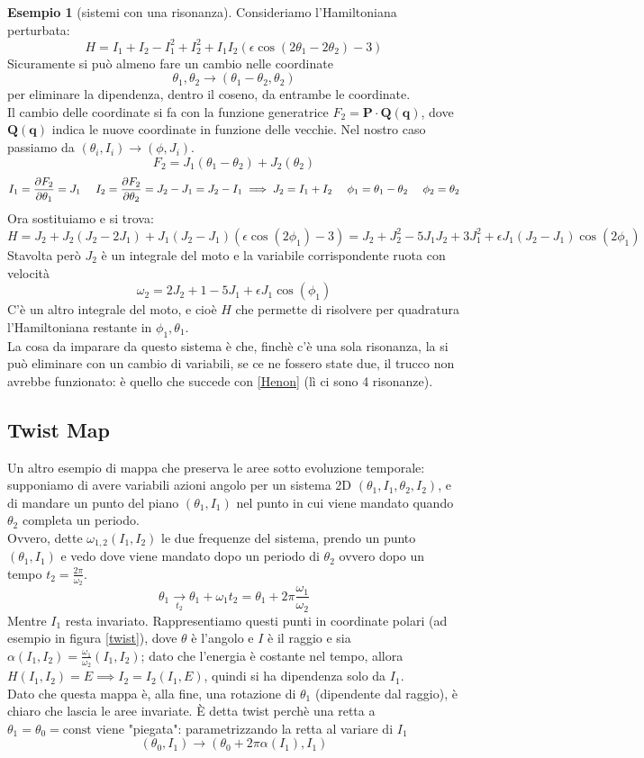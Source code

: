 \documentclass[a4paper,12pt]{article}
\theoremstyle{plain}
\renewcommand{\vec}[1]{{\boldsymbol{#1}}}
\theoremstyle{definition}
\newtheorem{exmp}{Esempio}[section]
\newcommand{\f}[2]{\frac{#1}{#2}}
\theoremstyle{remark}
\begin{document}
\begin{exmp}[sistemi con una risonanza]
	Consideriamo l'Hamiltoniana perturbata:
	\[H=I_1+I_2-I_1^2+I_2^2+I_1I_2(\epsilon\cos(2\theta_1-2\theta_2)-3)\]
	Sicuramente si può almeno fare un cambio nelle coordinate \[\theta_1,\theta_2\rightarrow(\theta_1-\theta_2,\theta_2)\]
	per eliminare la dipendenza, dentro il coseno, da entrambe le coordinate.
	\\Il cambio delle coordinate si fa con la funzione generatrice $F_2=\vec{P}\cdot\vec{Q}(\vec{q})$, dove $\vec{Q}(\vec{q})$ indica le nuove coordinate in funzione delle vecchie. Nel nostro caso passiamo da $(\theta_i,I_i)\rightarrow(\phi,J_i)$.
	\[F_2=J_1(\theta_1-\theta_2)+J_2(\theta_2)\]
	\[I_1=\pdv{F_2}{\theta_1}=J_1\:\:\:\:\:\:I_2=\pdv{F_2}{\theta_2}=J_2-J_1=J_2-I_1\implies J_2=I_1+I_2\:\:\:\:\:\:\phi_1=\theta_1-\theta_2\:\:\:\:\:\:\phi_2=\theta_2\]
	Ora sostituiamo e si trova:
	\[H=J_2+J_2(J_2-2J_1)+J_1(J_2-J_1)(\epsilon\cos(2\phi_1)-3)=J_2+J_2^2-5J_1J_2+3J_1^2+\epsilon J_1(J_2-J_1)\cos(2\phi_1)\]
	Stavolta però $J_2$ è un integrale del moto e la variabile corrispondente ruota con velocità \[\omega_2=2J_2+1-5J_1+\epsilon J_1\cos(\phi_1)\]
	C'è un altro integrale del moto, e cioè $H$ che permette di risolvere per quadratura l'Hamiltoniana restante in $\phi_1,\theta_1$.
	\\La cosa da imparare da questo sistema è che, finchè c'è una sola risonanza, la si può eliminare con un cambio di variabili, se ce ne fossero state due, il trucco non avrebbe funzionato: è quello che succede con \ref{Henon} (lì ci sono 4 risonanze).
\end{exmp}
\subsection{Twist Map}
Un altro esempio di mappa che preserva le aree sotto evoluzione temporale: supponiamo di avere variabili azioni angolo per un sistema 2D $(\theta_1,I_1,\theta_2,I_2)$, e di mandare un punto del piano $(\theta_1,I_1)$ nel punto in cui viene mandato quando $\theta_2$ completa un periodo.
\\ Ovvero, dette $\omega_{1,2}(I_1,I_2)$ le due frequenze del sistema, prendo un punto  $(\theta_1,I_1)$ e vedo dove viene mandato dopo un periodo di $\theta_2$ ovvero dopo un tempo $t_2=\f{2	\pi}{\omega_2	}$.
\[\theta_1\xrightarrow[t_2]{} \theta_1+\omega_1 t_2=\theta_1+2\pi\f{\omega_1}{\omega_2}\]
Mentre $I_1$ resta invariato. Rappresentiamo questi punti in coordinate polari (ad esempio in figura \ref{twist}), dove $\theta$ è l'angolo e $I$ è il raggio e sia $\alpha({I_1,I_2})=\f{\omega_1}{\omega_2}(I_1,I_2)$; dato che l'energia è costante nel tempo, allora $H(I_1,I_2)=E\implies I_2=I_2(I_1,E)$, quindi si ha dipendenza solo da $I_1$. \\
Dato che questa mappa è, alla fine, una rotazione di $\theta_1$ (dipendente dal raggio), è chiaro che lascia le aree invariate. È detta twist perchè una retta a $\theta_1=\theta_0=\text{const}$ viene "piegata": parametrizzando la retta al variare di $I_1$
\[(\theta_0,I_1) \rightarrow (\theta_0+2\pi\alpha(I_1),I_1)\] 
\end{document}

